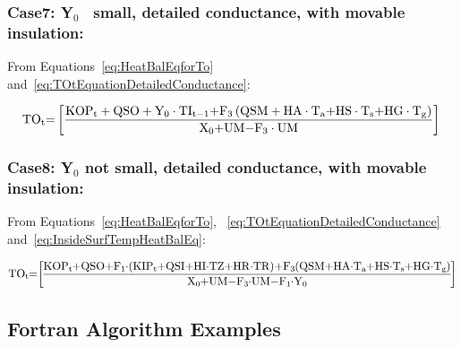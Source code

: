 \subsubsection{Case7: Y\(_{0}\)~ small, detailed conductance, with movable insulation:}\label{case7-yux5f0-small-detailed-conductance-with-movable-insulation}

From Equations~\ref{eq:HeatBalEqforTo} and~\ref{eq:TOtEquationDetailedConductance}:

\begin{equation}
{\rm{T}}{{\rm{O}}_{\rm{t}}}{\rm{ = }}\left[ {\frac{{{\rm{KO}}{{\rm{P}}_{\rm{t}}} + {\rm{QSO}} + {{\rm{Y}}_0}\cdot {\rm{T}}{{\rm{I}}_{{\rm{t - 1}}}}{\rm{ + }}{{\rm{F}}_{\rm{3}}}\left( {{\rm{QSM + HA}}\cdot {{\rm{T}}_{\rm{a}}}{\rm{ + HS}}\cdot {{\rm{T}}_{\rm{s}}}{\rm{ + HG}}\cdot {{\rm{T}}_{\rm{g}}}} \right)}}{{{{\rm{X}}_{\rm{0}}}{\rm{ + UM - }}{{\rm{F}}_{\rm{3}}}\cdot {\rm{UM}}}}} \right]{\rm{  }}
\label{eq:HeatBalanceEquationCase7}
\end{equation}

\subsubsection{Case8: Y\(_{0}\) not small, detailed conductance, with movable insulation:}\label{case8-yux5f0-not-small-detailed-conductance-with-movable-insulation}

From Equations~\ref{eq:HeatBalEqforTo}, ~\ref{eq:TOtEquationDetailedConductance} and~\ref{eq:InsideSurfTempHeatBalEq}:

\begin{equation}
\medmuskip=0mu
\thinmuskip=0mu
\thickmuskip=0mu
\nulldelimiterspace=0pt
\scriptspace=0pt
{\rm{T}}{{\rm{O}}_{\rm{t}}}{\rm{ = }}\left[ {\frac{{{\rm{KO}}{{\rm{P}}_{\rm{t}}} + {\rm{QSO}} + {{\rm{F}}_1}\cdot \left( {{\rm{KI}}{{\rm{P}}_{\rm{t}}}{\rm{ + QSI + HI}}\cdot {\rm{TZ + HR}}\cdot {\rm{TR}}} \right){\rm{ + }}{{\rm{F}}_{\rm{3}}}\left( {{\rm{QSM + HA}}\cdot {{\rm{T}}_{\rm{a}}}{\rm{ + HS}}\cdot {{\rm{T}}_{\rm{s}}}{\rm{ + HG}}\cdot {{\rm{T}}_{\rm{g}}}} \right)}}{{{{\rm{X}}_{\rm{0}}}{\rm{ + UM - }}{{\rm{F}}_{\rm{3}}}\cdot {\rm{UM - }}{{\rm{F}}_{\rm{1}}}\cdot {{\rm{Y}}_{\rm{0}}}}}} \right]{\rm{  }}
\label{eq:HeatBalanceEquationCase8}
\end{equation}

\subsection{Fortran Algorithm Examples}\label{fortran-algorithm-examples}


